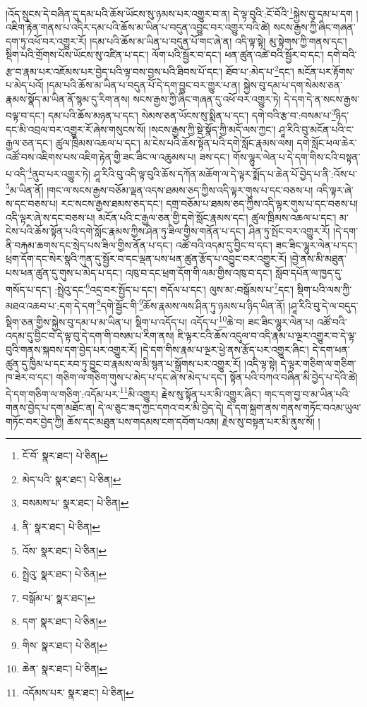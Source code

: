 །འོད་སྲུངས་དེ་བཞིན་དུ་དམ་པའི་ཆོས་ཡོངས་སུ་ཉམས་པར་འགྱུར་བ་ན། དེ་ལྟ་བུའི་:ངོ་བོའི་\footnote{ངོ་བོ་  སྣར་ཐང་།  པེ་ཅིན། }སྐྱེས་བུ་དམ་པ་དག །འཇིག་རྟེན་གནས་པ་འདིར་དམ་པའི་ཆོས་མ་ཡིན་པ་བདུན་འབྱུང་བར་འགྱུར་བའི་ཚེ། སངས་རྒྱས་ཀྱི་ཞིང་གཞན་དག་ཏུ་འཕོ་བར་འགྱུར་རོ། །དམ་པའི་ཆོས་མ་ཡིན་པ་བདུན་པོ་གང་ཞེ་ན། འདི་ལྟ་སྟེ། མུ་སྟེགས་ཀྱི་གནས་དང་། སྡིག་པའི་གྲོགས་པོས་ཡོངས་སུ་འཛིན་པ་དང་། ལོག་པའི་སྦྱོར་བ་དང་། ཕན་ཚུན་འཚེ་བའི་སྦྱོར་བ་དང་། དགེ་བའི་རྩ་བ་རྣམ་པར་འཇོམས་པར་བྱེད་པའི་ལྟ་བས་བྱས་པའི་ཐིབས་པོ་དང་། ཐོབ་པ་:མེད་པ་\footnote{མེད་པའི་  སྣར་ཐང་།  པེ་ཅིན། }དང་། མངོན་པར་རྟོགས་པ་མེད་པའོ། །དམ་པའི་ཆོས་མ་ཡིན་པ་བདུན་པོ་དེ་དག་བྱུང་བར་གྱུར་པ་ན། སྐྱེས་བུ་དམ་པ་དག་སེམས་ཅན་རྣམས་སྣོད་མ་ཡིན་ནོ་སྙམ་དུ་རིག་ནས། སངས་རྒྱས་ཀྱི་ཞིང་གཞན་དུ་འཕོ་བར་འགྱུར་ཏེ། དེ་དག་དེ་ན་སངས་རྒྱས་བལྟ་བ་དང་། དམ་པའི་ཆོས་མཉན་པ་དང་། སེམས་ཅན་ཡོངས་སུ་སྨིན་པ་དང་། དགེ་བའི་རྩ་བ་:བསམ་པ་\footnote{བསམས་པ་  སྣར་ཐང་།  པེ་ཅིན། }ཉིད་དང་མི་འབྲལ་བར་འགྱུར་རོ་ཞེས་གསུངས་སོ། །སངས་རྒྱས་ཀྱི་སྡེ་སྣོད་ཀྱི་མདོ་ལས་ཀྱང་། ཤཱ་རིའི་བུ་མངོན་པའི་ང་རྒྱལ་ཅན་དང་། ཚུལ་ཁྲིམས་འཆལ་པ་དང་། མ་ངེས་པའི་ཆོས་སྟོན་པའི་དགེ་སློང་རྣམས་ལས། དགེ་སློང་ཕལ་ཆེར་འཚོ་བས་འཇིགས་པས་འཇིག་རྟེན་གྱི་ཟང་ཟིང་ལ་འཆུམས་པ། ཟས་དང་། གོས་ལྷུར་ལེན་པ་དེ་དག་གིས་ངའི་བསྟན་པ་འདི་\footnote{ནི་  སྣར་ཐང་།  པེ་ཅིན། }ནུབ་པར་འགྱུར་ཏེ། ཤཱ་རིའི་བུ་འདི་ལྟ་བུའི་ཆོས་དཀོན་མཆོག་ལ་དེ་ལྟར་སྨོད་པ་ཆེན་པོ་བྱེད་པ་ནི་:འོས་པ་\footnote{འོས་  སྣར་ཐང་།  པེ་ཅིན། }མ་ཡིན་ནོ། །གང་ལ་སངས་རྒྱས་བཅོམ་ལྡན་འདས་ཐམས་ཅད་ཀྱིས་འདི་ལྟར་གུས་པ་དང་བཅས་པ། འདི་ལྟར་ཞེ་ས་དང་བཅས་པ། རང་སངས་རྒྱས་ཐམས་ཅད་དང་། དགྲ་བཅོམ་པ་ཐམས་ཅད་ཀྱིས་འདི་ལྟར་གུས་པ་དང་བཅས་པ། འདི་ལྟར་ཞེ་ས་དང་བཅས་པ། མངོན་པའི་ང་རྒྱལ་ཅན་གྱི་དགེ་སློང་རྣམས་དང་། ཚུལ་ཁྲིམས་འཆལ་པ་དང་། མ་ངེས་པའི་ཆོས་སྟོན་པའི་དགེ་སློང་རྣམས་ཀྱིས་ཤིན་ཏུ་ཟིལ་གྱིས་གནོན་པ་དང་། ཤིན་ཏུ་སྤོང་བར་འགྱུར་རོ། །དེ་དག་ནི་བརྐམ་ཆགས་དང་སྲེད་པས་ཟིལ་གྱིས་ནོན་པ་དང་། འཚོ་བའི་འདམ་དུ་བྱིང་བ་དང་། ཟང་ཟིང་ལྷུར་ལེན་པ་དང་། ཕྲག་དོག་དང་སེར་སྣའི་ཀུན་དུ་སྦྱོར་བ་དང་ལྡན་པས་ཕན་ཚུན་རྩོད་པ་འབྱུང་བར་འགྱུར་རོ། །བྱེ་ནས་མི་མཐུན་པས་ཕན་ཚུན་དུ་གུས་པ་མེད་པ་དང་། འཁུ་བ་དང་ཕྲག་དོག་གི་ལམ་གྱིས་འཁུ་བ་དང་། སློབ་དཔོན་ལ་ཁྱད་དུ་གསོད་པ་དང་། :སྤྲེའུ་དང་\footnote{སྤྲེའུ་  སྣར་ཐང་།  པེ་ཅིན། }འདྲ་བར་སྤྱོད་པ་དང་། གདོལ་པ་དང་། ལུས་མ་:བསྒོམས་པ་\footnote{བསྒོམ་པ་  སྣར་ཐང་། }དང་། སྡིག་པའི་ལས་ཀྱི་མཐའ་འཆབ་པ་:དག་དེ་དག་\footnote{དག་  སྣར་ཐང་།  པེ་ཅིན། }དགེ་སྦྱོང་གི་\footnote{གིས་  སྣར་ཐང་།  པེ་ཅིན། }ཆོས་རྣམས་ལས་ཤིན་ཏུ་ཉམས་པ་ཉིད་ཡིན་ནོ། །ཤཱ་རིའི་བུ་དེ་ལ་བདུད་སྡིག་ཅན་གྱིས་སྐྱེས་བུ་དམ་པ་མ་ཡིན་པ། སྡིག་པ་འདོད་པ། འདོད་པ་\footnote{ཆེན་  སྣར་ཐང་།  པེ་ཅིན། }ཆེ་བ། ཟང་ཟིང་ལྷུར་ལེན་པ། འཚོ་བའི་འདམ་དུ་བྱིང་བ་དེ་ལྟ་བུ་དེ་དག་གི་བསམ་པ་རིག་ནས། ཇི་ལྟར་ངའི་ཆོས་འདུལ་བ་འདི་རྣམ་པ་ལྔར་འགྱུར་བ་དེ་ལྟ་བུའི་གནས་སྐབས་དག་བྱེད་པར་འགྱུར་རོ། །དེ་དག་གིས་རྣམ་པ་ལྔར་ཕྱེ་ནས་རྩོད་པར་འགྱུར་ཞིང་། དེ་དག་ཕན་ཚུན་དུ་ཁྱིམ་པ་དང་རབ་ཏུ་བྱུང་བ་རྣམས་ལ་མི་སྙན་པ་སྒྲོགས་པར་འགྱུར་རོ། །འདི་ལྟ་སྟེ། དེ་ལྟར་གཅིག་ལ་གཅིག་ཁ་ཟེར་བ་དང་། གཅིག་ལ་གཅིག་གུས་པ་མེད་པ་དང་ཞེ་ས་མེད་པ་དང་། སྟོན་པའི་བཀའ་བཞིན་མི་བྱེད་པ་དེའི་ཚེ། དེ་དག་གཅིག་ལ་གཅིག་:འདོམ་པར་\footnote{འདོམས་པར་  སྣར་ཐང་།  པེ་ཅིན། }མི་འགྱུར། རྗེས་སུ་སྟོན་པར་མི་འགྱུར་ཞིང་། གང་དག་བྱ་བ་མ་ཡིན་པའི་གནས་བྱེད་པ་དག་མཐོང་ན། དེ་ལ་ཅུང་ཟད་ཀྱང་དགའ་བར་མི་བྱེད་དེ། དེ་དག་སྐྲག་ནས་གནས་གཏོང་བའམ་ཡུལ་གཏོང་བར་བྱེད་ཀྱི། ཆོས་དང་མཐུན་པས་གདམས་ངག་དབོག་པའམ། རྗེས་སུ་བསྟན་པར་མི་ནུས་སོ། །
